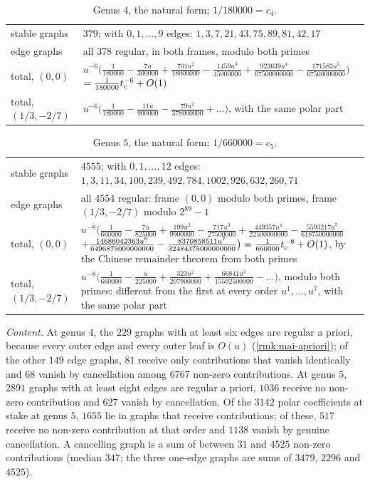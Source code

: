 \begin{table}[ht]
\centering\small
\begin{tabular}{l|p{}}
stable graphs & $379$; with $0,1,\dots,9$ edges: $1,3,7,21,43,75,89,81,42,17$\\
edge graphs & all $378$ regular, in both frames, modulo both primes\\
total, $(0,0)$ & $u^{-6}\bigl(\tfrac{1}{180000}-\tfrac{7u}{300000}+\tfrac{701u^2}{18000000}-\tfrac{1459u^3}{45000000}+\tfrac{923639u^4}{67500000000}-\tfrac{171583u^5}{67500000000}\bigr)$ $=\tfrac{1}{180000}t_{\mathrm{c}}^{-6}+O(1)$\\
total, $(1/3,-2/7)$ & $u^{-6}\bigl(\tfrac{1}{180000}-\tfrac{11u}{900000}-\tfrac{79u^2}{378000000}+\dots\bigr)$, with the same polar part\\
\end{tabular}
\caption{Genus $4$, the natural form; $1/180000=c_4$.}
\label{tab:evi-g4}
\end{table}

\begin{table}[ht]
\centering\small
\begin{tabular}{l|p{}}
stable graphs & $4555$; with $0,1,\dots,12$ edges: $1,3,11,34,100,239,492,784,1002,926,632,260,71$\\
edge graphs & all $4554$ regular: frame $(0,0)$ modulo both primes, frame $(1/3,-2/7)$ modulo $2^{89}-1$\\
total, $(0,0)$ & $u^{-8}\bigl(\tfrac{1}{660000}-\tfrac{7u}{825000}+\tfrac{199u^2}{9900000}-\tfrac{717u^3}{27500000}+\tfrac{449357u^4}{22500000000}-\tfrac{5593217u^5}{618750000000}$ $+\tfrac{14686042363u^6}{6496875000000000}-\tfrac{8370858511u^7}{32484375000000000}\bigr)=\tfrac{1}{660000}t_{\mathrm{c}}^{-8}+O(1)$, by the Chinese remainder theorem from both primes\\
total, $(1/3,-2/7)$ & $u^{-8}\bigl(\tfrac{1}{660000}-\tfrac{u}{225000}+\tfrac{323u^2}{207900000}+\tfrac{66841u^3}{15592500000}-\dots\bigr)$, modulo both primes: different from the first at every order $u^1,\dots,u^7$, with the same polar part\\
\end{tabular}
\caption{Genus $5$, the natural form; $1/660000=c_5$.}
\label{tab:evi-g5}
\end{table}

\emph{Content.} At genus $4$, the $229$ graphs with at least six edges are regular a priori, because every outer edge and every outer leaf is $O(u)$ (\cref{rmk:mai-apriori}); of the other $149$ edge graphs, $81$ receive only contributions that vanish identically and $68$ vanish by cancellation among $6767$ non-zero contributions. At genus $5$, $2891$ graphs with at least eight edges are regular a priori, $1036$ receive no non-zero contribution and $627$ vanish by cancellation. Of the $3142$ polar coefficients at stake at genus $5$, $1655$ lie in graphs that receive contributions; of these, $517$ receive no non-zero contribution at that order and $1138$ vanish by genuine cancellation. A cancelling graph is a sum of between $31$ and $4525$ non-zero contributions (median $347$; the three one-edge graphs are sums of $3479$, $2296$ and $4525$).


